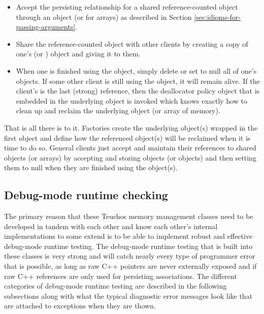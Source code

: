 \documentclass[pdf,ps2pdf,11pt]{SANDreport}
\begin{document}
\begin{itemize}

{}\item Accept the persisting relationship for a shared
reference-counted object through an {} object (or
{} for arrays) as described in Section
{}\ref{sec:idioms-for-passing-arguments}.

{}\item Share the reference-counted object with other clients by
creating a copy of one's {} (or {}) object and
giving it to them.

{}\item When one is finished using the object, simply delete or set to
null all of one's {} objects.  If some other client is still
using the object, it will remain alive.  If the client's is the last
(strong) reference, then the deallocator policy object that is
embedded in the underlying {} object is invoked which
knows exactly how to clean up and reclaim the underlying object (or
array of memory).

\end{itemize}

That is all there is to it.  Factories create the underlying object(s)
wrapped in the first {} object and define how the referenced
object(s) will be reclaimed when it is time to do so.  General clients
just accept and maintain their references to shared objects (or
arrays) by accepting and storing {} objects (or
{} objects) and then setting them to null when they are
finished using the object(s).


%
{}\subsection{Debug-mode runtime checking}
\label{sec:debug-mode-runtime-checking}
%

The primary reason that these Teuchos memory management classes need
to be developed in tandem with each other and know each other's
internal implementations to some extend is to be able to implement
robust and effective debug-mode runtime testing.  The debug-mode
runtime testing that is built into these classes is very strong and
will catch nearly every type of programmer error that is possible, as
long as raw C++ pointers are never externally exposed and if raw C++
references are only used for persisting associations.  The different
categories of debug-mode runtime testing are described in the
following subsections along with what the typical diagnostic error
messages look like that are attached to exceptions when they are
thown.
\end{document}
